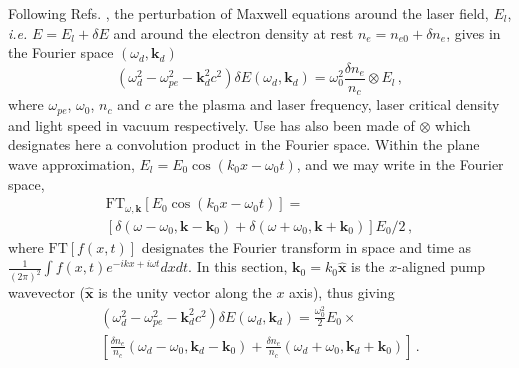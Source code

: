 \documentclass[
 reprint,
 superscriptaddress,
 amsmath,amssymb,
 aps,
]{revtex4-1}
\begin{document}
Following Refs. \cite[]{Akhiezer_fluctuations,phd_Michel}, the perturbation of Maxwell equations around the laser field, $E_l$, \emph{i.e.} $E = E_l + \delta E$ and around the  electron density at rest $n_e = n_{e0}+\delta n_e$, gives in the Fourier space $(\omega_d,\mathbf{k}_d)$
\begin{equation}
    (\omega_d^2 - \omega_{pe}^2 -\mathbf{k}_d^2c^2)\delta E(\omega_d,\mathbf{k}_d) = \omega_0^2 \frac{\delta n_e }{n_c}\otimes E_l  \, ,\label{eq:max1}
\end{equation}
where $\omega_{pe}$, $\omega_{0}$,  $n_c$ and $c$ are the plasma and laser frequency, laser critical density and light speed in vacuum respectively. Use has also been made of $\otimes$ which designates  here a convolution product in the Fourier space.
Within the plane wave approximation,   $E_l=E_0 \cos(k_0 x - \omega_0t)$,
and we may write in the Fourier space,  
\begin{align}
   \mathrm{FT}_{\omega,\mathbf{k}}[ E_0 \cos(k_0 x - \omega_0t) ]= \nonumber\\ [ \delta(\omega-\omega_0, \mathbf{k}-\mathbf{k}_0) + \delta(\omega+\omega_0, \mathbf{k}+\mathbf{k}_0) ]E_0/2 \, , 
\end{align}
where $\mathrm{FT}[f(x,t)]$ designates the Fourier transform in space and time as $\frac{1}{(2\pi)^2}\int f(x,t) e^{-ikx+i\omega t}dxdt$. In this section,  $\mathbf{k}_0=k_0\hat{\mathbf{x}}$ is the $x$-aligned pump wavevector ($\hat{\mathbf{x}}$ is the unity vector along the $x$ axis), thus giving 
\begin{align}
    (\omega_d^2 - \omega_{pe}^2 -\mathbf{k}_d^2c^2)\delta E(\omega_d,\mathbf{k}_d) = \frac{\omega_0^2}{2} E_0\times \nonumber\\ \left[\frac{\delta n_e }{n_c}(\omega_d-\omega_0, \mathbf{k}_d-\mathbf{k}_0) +\frac{\delta n_e }{n_c}(\omega_d+\omega_0, \mathbf{k}_d+\mathbf{k}_0) \right] \, .\label{eq:max2}
\end{align}
\end{document}
